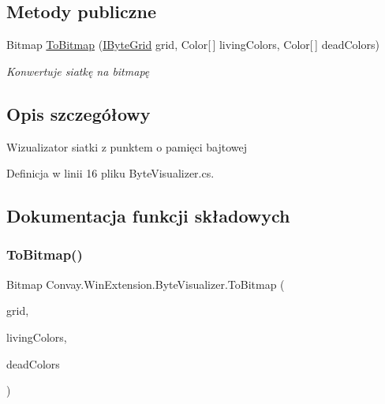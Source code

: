 \subsection*{Metody publiczne}
\begin{DoxyCompactItemize}
\item 
Bitmap \hyperlink{class_convay_1_1_win_extension_1_1_byte_visualizer_a4c5c56fc18ec28d6845cddf447655b5b}{To\+Bitmap} (\hyperlink{interface_convay_1_1_core_1_1_interfaces_1_1_i_byte_grid}{I\+Byte\+Grid} grid, Color\mbox{[}$\,$\mbox{]} living\+Colors, Color\mbox{[}$\,$\mbox{]} dead\+Colors)
\begin{DoxyCompactList}\small\item\em Konwertuje siatkę na bitmapę \end{DoxyCompactList}\end{DoxyCompactItemize}


\subsection{Opis szczegółowy}
Wizualizator siatki z punktem o pamięci bajtowej 



Definicja w linii 16 pliku Byte\+Visualizer.\+cs.



\subsection{Dokumentacja funkcji składowych}
\hypertarget{class_convay_1_1_win_extension_1_1_byte_visualizer_a4c5c56fc18ec28d6845cddf447655b5b}{}\label{class_convay_1_1_win_extension_1_1_byte_visualizer_a4c5c56fc18ec28d6845cddf447655b5b} 
\subsubsection{\texorpdfstring{To\+Bitmap()}{ToBitmap()}}
{\footnotesize\ttfamily Bitmap Convay.\+Win\+Extension.\+Byte\+Visualizer.\+To\+Bitmap (\begin{DoxyParamCaption}\item[{\hyperlink{interface_convay_1_1_core_1_1_interfaces_1_1_i_byte_grid}{I\+Byte\+Grid}}]{grid,  }\item[{Color \mbox{[}$\,$\mbox{]}}]{living\+Colors,  }\item[{Color \mbox{[}$\,$\mbox{]}}]{dead\+Colors }\end{DoxyParamCaption})}



